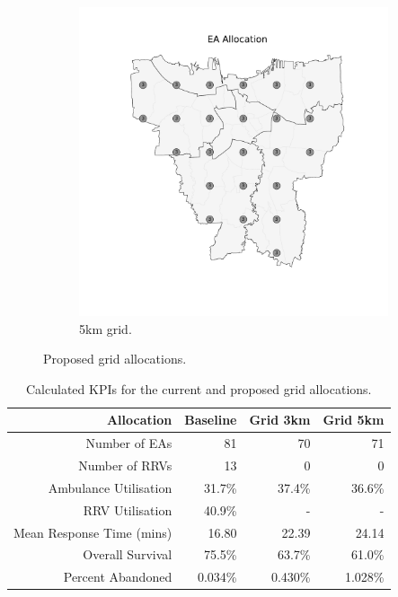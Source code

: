 \documentclass[preprint,12pt]{elsarticle}
\begin{document}
\begin{figure}
\begin{center}
\begin{subfigure}{0.48\textwidth}
\includegraphics[width=\textwidth]{img/map_grid5km_proposed}
\caption{5km grid.}
\end{subfigure}
\caption{Proposed grid allocations.}
\label{fig:grid_allocations}
\end{center}
\end{figure}

\begin{table}
\begin{center}
\begin{tabular}{rrrr}
\toprule
Allocation & Baseline & Grid 3km & Grid 5km \\
\midrule
Number of EAs & 81 & 70 & 71 \\
Number of RRVs & 13 & 0 & 0 \\
Ambulance Utilisation & 31.7\% & 37.4\% & 36.6\% \\
RRV Utilisation & 40.9\% & - & - \\
Mean Response Time (mins) & 16.80 & 22.39 & 24.14 \\
Overall Survival & 75.5\% & 63.7\% & 61.0\% \\
Percent Abandoned & 0.034\% & 0.430\% & 1.028\% \\
\bottomrule
\end{tabular}
\caption{Calculated KPIs for the current and proposed grid allocations.}
\label{tbl:current_grid_results}
\end{center}
\end{table}
\end{document}
